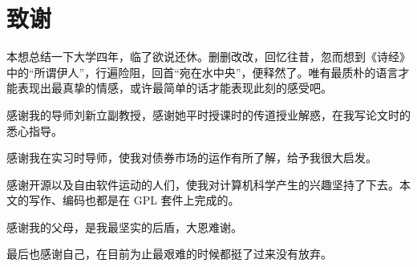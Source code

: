 \chapter{致谢}

本想总结一下大学四年，临了欲说还休。删删改改，回忆往昔，忽而想到《诗经》中的“所谓伊人”，行遍险阻，回首“宛在水中央”，便释然了。唯有最质朴的语言才能表现出最真挚的情感，或许最简单的话才能表现此刻的感受吧。

感谢我的导师刘新立副教授，感谢她平时授课时的传道授业解惑，在我写论文时的悉心指导。

感谢我在实习时导师，使我对债券市场的运作有所了解，给予我很大启发。

感谢开源以及自由软件运动的人们，使我对计算机科学产生的兴趣坚持了下去。本文的写作、编码也都是在 GPL 套件上完成的。

感谢我的父母，是我最坚实的后盾，大恩难谢。

最后也感谢自己，在目前为止最艰难的时候都挺了过来没有放弃。
